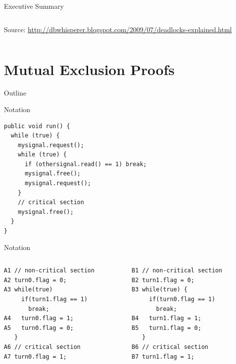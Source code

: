 \begin{frame}{Executive Summary}
\begin{columns}[c]
\begin{column}{0.4\textwidth}
\begin{center}
        \tiny{Source: \url{http://dbwhisperer.blogspot.com/2009/07/deadlocks-explained.html}}
      \end{center}
    \end{column}
  \end{columns}
\end{frame}


\section{Mutual Exclusion Proofs}

\begin{frame}{Outline}
  \tableofcontents[current]
\end{frame}

\begin{frame}[fragile]{Notation}
\begin{lstlisting}
public void run() {
  while (true) {
    mysignal.request();
    while (true) {
      if (othersignal.read() == 1) break;
      mysignal.free();
      mysignal.request();
    }
    // critical section
    mysignal.free();
  }
}
\end{lstlisting}
\end{frame}

\begin{frame}[fragile]{Notation}
  \begin{columns}[c]
    \begin{column}{0.50\textwidth}
\begin{lstlisting}[basicstyle=\fontsize{9}{11}\selectfont\ttfamily]
A1 // non-critical section
A2 turn0.flag = 0;
A3 while(true)
     if(turn1.flag == 1) 
       break;
A4   turn0.flag = 1;
A5   turn0.flag = 0;
   }
A6 // critical section
A7 turn0.flag = 1;
\end{lstlisting}
    \end{column}
    \begin{column}{0.50\textwidth}
\begin{lstlisting}[basicstyle=\fontsize{9}{11}\selectfont\ttfamily]
B1 // non-critical section
B2 turn1.flag = 0;
B3 while(true) {
     if(turn0.flag == 1) 
       break;
B4   turn1.flag = 1;
B5   turn1.flag = 0;
   }
B6 // critical section
B7 turn1.flag = 1;
\end{lstlisting}
    \end{column}
  \end{columns}
\end{frame}

